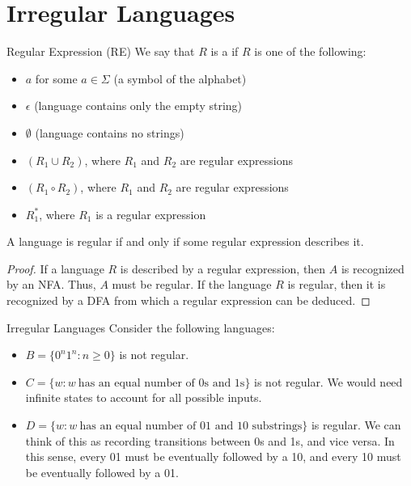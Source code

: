 \documentclass[12pt]{report}
\begin{document}

\chapter{Irregular Languages}
\begin{dfnbox}{Regular Expression (RE)}{}
    We say that $R$ is a  if $R$ is one of the following:
    \begin{itemize}[noitemsep]
        \item $a$ for some $a \in \Sigma$ (a symbol of the alphabet)
        \item $\epsilon$ (language contains only the empty string)
        \item $\emptyset$ (language contains no strings)
        \item $(R_1 \cup R_2)$, where $R_1$ and $R_2$ are regular expressions
        \item $(R_1 \circ R_2)$, where $R_1$ and $R_2$ are regular expressions
        \item $R_1^*$, where $R_1$ is a regular expression
    \end{itemize}
\end{dfnbox}

\begin{thmbox}{}{}
    A language is regular if and only if some regular expression describes it.
    \tcblower
    \begin{proof}
        If a language $R$ is described by a regular expression, then $A$ is recognized by an NFA. Thus, $A$ must be regular. If the language $R$ is regular, then it is recognized by a DFA from which a regular expression can be deduced.
    \end{proof}
\end{thmbox}

\begin{exbox}{Irregular Languages}{}
    Consider the following languages:
    \begin{itemize}[noitemsep]
        \item $B = \{ 0^n 1^n : n \geq 0\}$ is not regular.
        \item $C = \{ w : w\ \text{has an equal number of 0s and 1s} \}$ is not regular. We would need infinite states to account for all possible inputs.
        \item $D = \{ w : w\ \text{has an equal number of 01 and 10 substrings} \}$ is regular. We can think of this as recording transitions between 0s and 1s, and vice versa. In this sense, every 01 must be eventually followed by a 10, and every 10 must be eventually followed by a 01.
    \end{itemize}
\end{exbox}
\end{document}
